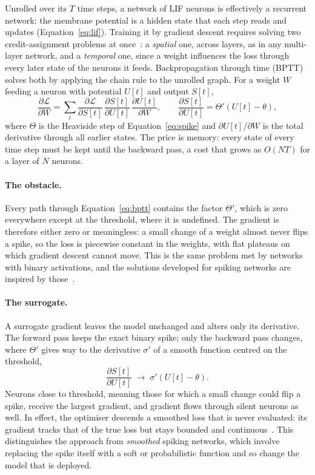 Unrolled over its $T$ time steps, a network of LIF neurons is effectively a recurrent
network: the membrane potential is a hidden state that each step reads and
updates (Equation~\ref{eq:lif}). Training it by gradient descent requires solving
two credit-assignment problems at once~\cite{neftci2019surrogate}: a
\emph{spatial} one, across layers, as in any multi-layer network, and a
\emph{temporal} one, since a weight influences the loss through every later
state of the neurons it feeds. Backpropagation through time (BPTT) solves both
by applying the chain rule to the unrolled graph. For a weight $W$ feeding a
neuron with potential $U[t]$ and output $S[t]$,
\begin{equation}
\frac{\partial \mathcal{L}}{\partial W}
= \sum_{t} \frac{\partial \mathcal{L}}{\partial S[t]}\,
  \frac{\partial S[t]}{\partial U[t]}\,
  \frac{\partial U[t]}{\partial W},
\qquad
\frac{\partial S[t]}{\partial U[t]} = \Theta'\!\left(U[t] - \theta\right),
\label{eq:bptt}
\end{equation}
where $\Theta$ is the Heaviside step of Equation~\ref{eq:spike} and
$\partial U[t]/\partial W$ is the total derivative through all earlier states.
The price is
memory: every state of every time step must be kept until the backward pass,
a cost that grows as $O(NT)$ for a layer of $N$ neurons.

\paragraph{The obstacle.} Every path through Equation~\ref{eq:bptt} contains the
factor $\Theta'$, which is zero everywhere except at the threshold, where it is
undefined. The gradient is therefore either zero or meaningless: a small change
of a weight almost never flips a spike, so the loss is piecewise constant in the
weights, with flat plateaus on which gradient descent cannot move. This is the
same problem met by networks with binary activations, and the solutions
developed for spiking networks are inspired by those~\cite{neftci2019surrogate}.

\paragraph{The surrogate.} A surrogate gradient leaves the model unchanged and
alters only its derivative. The forward pass keeps the exact binary spike; only
the backward pass changes, where $\Theta'$ gives way to the derivative
$\sigma'$ of a smooth function centred on the threshold,
\begin{equation}
\frac{\partial S[t]}{\partial U[t]} \;\longrightarrow\;
\sigma'\!\left(U[t] - \theta\right).
\end{equation}
Neurons close to threshold, meaning those for which a small change could flip a spike,
receive the largest gradient, and gradient flows through silent neurons as well.
In effect, the optimiser descends a smoothed loss that is never evaluated: its
gradient tracks that of the true loss but stays bounded and
continuous~\cite{neftci2019surrogate}. This
distinguishes the approach from \emph{smoothed} spiking networks, which involve replacing
the spike itself with a soft or probabilistic function and so change the model
that is deployed.

